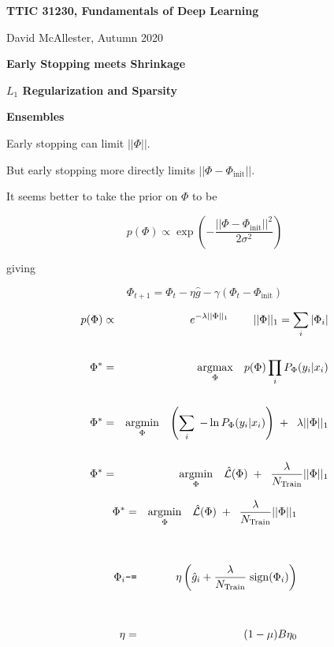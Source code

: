 





{\Huge


\centerline{\bf TTIC 31230, Fundamentals of Deep Learning}
\bigskip
\centerline{David McAllester, Autumn 2020}

\vfill
\centerline{\bf Early Stopping meets Shrinkage}
\vfill
\centerline{\bf $L_1$ Regularization and Sparsity}
\vfill
\centerline{\bf Ensembles}
\vfill
\vfill


Early stopping can limit $||\Phi||$.

\vfill
But early stopping more directly limits $||\Phi - \Phi_\mathrm{init}||$.

\vfill
It seems better to take the prior on $\Phi$ to be

\vfill
{\color{red} $$p(\Phi) \propto \exp\left(-\frac{||\Phi - \Phi_{\mathrm{init}}||^2}{2\sigma^2}\right)$$}

\vfill
giving

\vfill
$$\Phi_{t+1} = \Phi_t - \eta\hat{g} - \gamma(\Phi_t - \Phi_{\mathrm{init}})$$


\begin{eqnarray*}
p(\Phi) & \propto & e^{-\lambda ||\Phi||_1} \;\;\;\;\;\;\;\;||\Phi||_1 = \sum_i |\Phi_i| \\
\\
\Phi^* & = & \operatorname*{argmax}_\Phi \; \;\;p(\Phi) \prod_i P_\Phi(y_i|x_i) \\
\\
\Phi^* & = & \operatorname*{argmin}_\Phi \; \;\;\left(\sum_i\; -\ln P_\Phi(y_i|x_i)\right) \;+ \; \;\lambda||\Phi||_1 \\
\\
\Phi^* & = & \operatorname*{argmin}_\Phi \; \;\;\hat{\cal L}(\Phi) \;+ \; \;\frac{\lambda}{N_{\mathrm{Train}}}||\Phi||_1
\end{eqnarray*}


\begin{eqnarray*}
\Phi^* & = & \operatorname*{argmin}_\Phi \; \;\;\hat{\cal L}(\Phi) \;+ \; \;\frac{\lambda}{N_{\mathrm{Train}}}||\Phi||_1 \\
\\
\\
\Phi_i & \mbox{\tt -=} & \eta \left(\hat{g}_i + \frac{\lambda}{N_{\mathrm{Train}}}\;\mathrm{sign}(\Phi_i)\right) \\
\\
\\
\eta & = & (1-\mu)B\eta_0
\end{eqnarray*}

}
